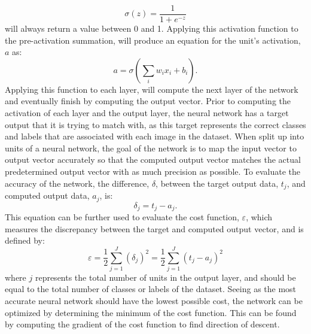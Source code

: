 \documentclass[twocolumn]{article}
\begin{document}
\begin{equation}
\sigma(z) = \frac{1}{1+e^{-z}}
\end{equation} 
will always return a value between 0 and 1. \cite{tom} Applying this activation function to the pre-activation summation, will produce an equation for the unit's activation, $a$ as: 
\begin{equation}a = \sigma(\sum_{i}w_{i}x_{i}+b_{i}).\end{equation}
Applying this function to each layer, will compute the next layer of the network and eventually finish by computing the output vector. Prior to computing the activation of each layer and the output layer, the neural network has a target output that it is trying to match with, as this target represents the correct classes and labels that are associated with each image in the dataset. When split up into units of a neural network, the goal of the network is to map the input vector to output vector accurately so that the computed output vector matches the actual predetermined output vector with as much precision as possible. \cite{reid} To evaluate the accuracy of the network, the difference, $\delta$, between the target output data, $t_{j}$, and computed output data, $a_{j}$, is:
\begin{equation}
    \delta_{j} = t_{j} - a_{j}.
\end{equation}
This equation can be further used to evaluate the cost function, $\varepsilon$, which measures the discrepancy between the target and computed output vector\cite{martens}, and is defined by:
\begin{equation}
    \varepsilon = \frac{1}{2}\sum_{j=1}^{J}\left (\delta_{j}  \right )^{2}=\frac{1}{2}\sum_{j=1}^{J}\left (t_{j} - a_{j} \right )^{2}
\end{equation}
where $j$ represents the total number of units in the output layer, and should be equal to the total number of classes or labels of the dataset. Seeing as the most accurate neural network should have the lowest possible cost, the network can be optimized by determining the minimum of the cost function. This can be found by computing the gradient of the cost function to find direction of descent. \cite{jorge}
\end{document}
